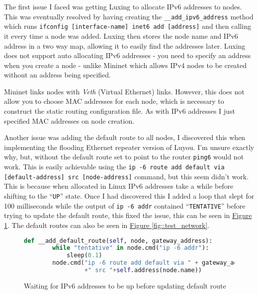 \documentclass[12pt,a4paper,twoside,openany]{report}
\begin{document}
\bigskip

The first issue I faced was getting Luxing to allocate IPv6 addresses to nodes. This was eventually resolved by having creating the \verb!__add_ipv6_address! method which runs \verb!ifconfig [interface-name] inet6 add [address]! and then calling it every time a node was added. Luxing then stores the node name and IPv6 address in a two way map, allowing it to easily find the addresses later. Luxing does not support auto allocating IPv6 addresses - you need to specify an address when you create a node - unlike Mininet which allows IPv4 nodes to be created without an address being specified.

\bigskip

Mininet links nodes with \textit{Veth} (Virtual Ethernet) links. However, this does not allow you to choose MAC addresses for each node, which is necessary to construct the static routing configuration file. As with IPv6 addresses I just specified MAC addresses on node creation.

\bigskip

Another issue was adding the default route to all nodes, I discovered this when implementing the flooding Ethernet repeater version of Luyou.  I'm unsure exactly why, but, without the default route set to point to the router \verb!ping6! would not work. This is easily achievable using the \verb!ip -6 route add default via [default-address] src [node-address]! command, but this seem didn't work.  This is because when allocated in Linux IPv6 addresses take a while before shifting to the ``\verb!UP!'' state.  Once I had discovered this I added a loop that slept for 100 milliseconds while the output of \verb!ip -6 addr! contained ``\verb!TENTATIVE!'' before trying to update the default route, this fixed the issue, this can be seen in \hyperref[fig::tentative]{Figure }\ref{fig::tentative}.  The default routes can also be seen in \hyperref[fig::test_network]{Figure }\ref{fig::test_network}.


\begin{figure}
\begin{lstlisting}[language=Python]
def __add_default_route(self, node, gateway_address):
        while "tentative" in node.cmd("ip -6 addr"):
            sleep(0.1)
        node.cmd("ip -6 route add default via " + gateway_address 
                 +" src "+self.address(node.name))
\end{lstlisting}
\caption{Waiting for IPv6 addresses to be up before updating default route}
\label{fig::tentative}
\end{figure}
\end{document}

